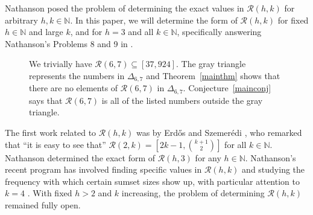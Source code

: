 \documentclass{daj}
\theoremstyle{definition}
\theoremstyle{remark}
\numberwithin{equation}{section}
\numberwithin{theorem}{section}
\newcommand{\N}{\mathbb{N}}
\newcommand{\calr}{\mathcal{R}}
\begin{document}
Nathanson \cite{nathanson25Problems} posed the problem of determining the exact values in $\mathcal{R}(h,k)$ for arbitrary $h,k \in \N$. In this paper, we will determine the form of $\mathcal{R}(h,k)$ for fixed $h \in \N$ and large $k$, and for $h=3$ and all $k \in \N$, specifically answering Nathanson's Problems 8 and 9 in \cite{nathanson25Problems}.

\begin{figure}[h]
\begin{center}
\end{center}
\caption{We trivially have $\mathcal{R}(6,7) \subseteq [37,924]$. The gray triangle represents the numbers in $\Delta_{6,7}$ and Theorem~\ref{mainthm} shows that there are no elements of $\mathcal{R}(6,7)$ in $\Delta_{6,7}$. Conjecture~\ref{mainconj} says that $\calr(6,7)$ is all of the listed numbers outside the gray triangle.}\label{figure1}
\end{figure}

The first work related to $\calr(h,k)$ was by Erd\H{o}s and Szemer\'edi \cite{ES83}, who remarked that ``it is easy to see that'' $\mathcal{R}(2,k) = \left[2k-1,\binom{k+1}{2}\right]$ for all $k \in \N$. Nathanson \cite{nathanson25Problems} determined the exact form of $\calr(h,3)$  for any 
$h \in \N$. Nathanson's recent program has involved finding specific values in $\calr(h,k)$ and studying the frequency with which certain sumset sizes show 
up, with particular attention to $k=4$ 
\cite{nathanson2025additivesumsetsizestetrahedral,nathanson2025explicitsumsetsizesadditive,nathanson25Problems,nathanson2025triangulartetrahedralnumberdifferences,nathanson2025compressioncomplexitysumsetsizes,obryant2025nathansonstriangularnumberphenomenon}. With fixed $h>2$ and $k$ increasing, the problem of determining $\calr(h,k)$ remained fully open.
\end{document}
